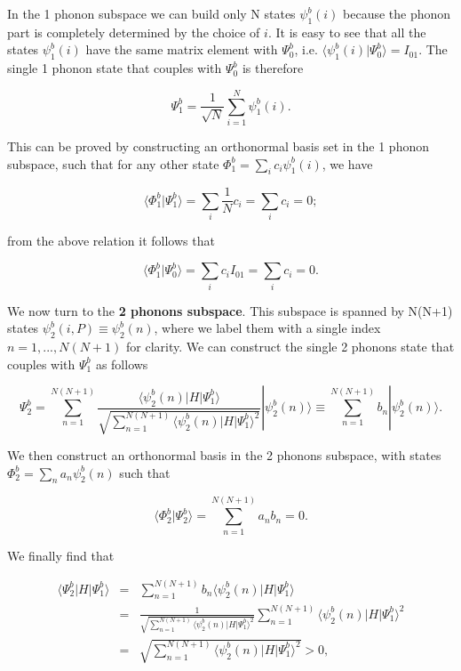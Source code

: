 \documentclass[pt12]{article}
\begin{document}
In the 1 phonon subspace we can build only N states $\psi^b_1(i)$
because the phonon part is completely determined by the choice of
$i$. It is easy to see that all the states $\psi^b_1(i)$ have the
same matrix element with $\Psi^b_0$, i.e. $\langle \psi^b_1(i) |
\Psi^b_0 \rangle = I_{01}$. The single 1 phonon state that couples
with $\Psi^b_0$ is therefore

\begin{equation}
\Psi^b_1=\frac{1}{\sqrt{N}} \sum_{i=1}^N \psi^b_1(i).
\end{equation}

This can be proved by constructing an orthonormal basis set in the 1
phonon subspace, such that for any other state $\Phi^b_1=\sum_i c_i
\psi^b_1(i)$, we have

\begin{equation}
\langle \Phi^b_1 | \Psi^b_1 \rangle = \sum_i \frac{1}{N} c_i =
\sum_i c_i = 0;
\end{equation}

from the above relation it follows that

\begin{equation}
\langle \Phi^b_1 | \Psi^b_0 \rangle = \sum_i c_i I_{01}= \sum_i c_i
= 0.
\end{equation}

We now turn to the \textbf{2 phonons subspace}. This subspace is
spanned by N(N+1) states $\psi^b_2(i, P)\equiv \psi^b_2(n)$, where
we label them with a single index $n=1,...,N(N+1)$ for clarity. We
can construct the single 2 phonons state that couples with
$\Psi^b_1$ as follows

\begin{equation}
\Psi^b_2=\sum_{n=1}^{N(N+1)} \frac{ \langle \psi^b_2(n) | H |
\Psi^b_1 \rangle}{\sqrt{\sum_{n=1}^{N(N+1)} \langle \psi^b_2(n) | H
| \Psi^b_1 \rangle^2}} |\psi^b_2(n)\rangle \equiv
\sum_{n=1}^{N(N+1)} b_n |\psi^b_2(n)\rangle .
\end{equation}

We then construct an orthonormal basis in the 2 phonons subspace,
with states $\Phi^b_2=\sum_n a_n \psi^b_2(n)$ such that

\begin{equation}
\langle \Phi^b_2 | \Psi^b_2 \rangle = \sum_{n=1}^{N(N+1)} a_n b_n  =
0.
\end{equation}

We finally find that

\begin{eqnarray}
\langle \Psi^b_2 | H | \Psi^b_1 \rangle &=& \sum_{n=1}^{N(N+1)} b_n
\langle \psi^b_2(n) | H | \Psi^b_1 \rangle \\ \nonumber &=&
\frac{1}{\sqrt{\sum_{n=1}^{N(N+1)}  \langle \psi^b_2(n) | H |
\Psi^b_1 \rangle^2}} \sum_{n=1}^{N(N+1)} \langle \psi^b_2(n) | H |
\Psi^b_1 \rangle^2
\\ \nonumber
&=& \sqrt{\sum_{n=1}^{N(N+1)}  \langle \psi^b_2(n) | H | \Psi^b_1
\rangle^2} > 0,
\end{eqnarray}
\end{document}
